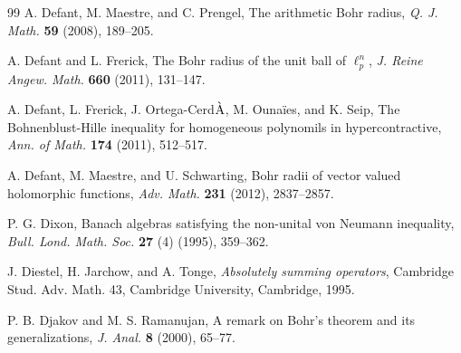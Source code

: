 \documentclass[a4paper,11pt, reqno]{amsart}
\theoremstyle{definition}
\begin{document}
\begin{thebibliography}{99}
	 {\sc A. Defant,  M. Maestre}, and {\sc  C. Prengel}, The arithmetic Bohr radius, {\it Q. J. Math.} {\bf 59} (2008), 189--205.
	
	
	
	 {\sc A. Defant} and {\sc L. Frerick}, The Bohr radius of the unit ball of $\ell^n _p$, {\it J. Reine Angew. Math.} {\bf 660} (2011), 131--147.
	
	 {\sc A. Defant, L. Frerick, J. Ortega-Cerd${\rm \grave{A}}$, M. Ouna{\"i}es}, and {\sc K. Seip}, The Bohnenblust-Hille inequality for homogeneous polynomils in hypercontractive, {\it Ann. of Math.} {\bf 174} (2011), 512--517.
	
	
	
	
	
	 {\sc A. Defant, M. Maestre}, and {\sc  U. Schwarting}, Bohr radii of vector valued holomorphic functions, {\it Adv. Math.} {\bf 231} (2012), 2837--2857.
	
			 {\sc P. G. Dixon}, Banach algebras satisfying the non-unital von Neumann inequality, \textit{Bull. Lond. Math. Soc.} \textbf{27} (4) (1995), 359--362.
	
	 {\sc J. Diestel, H. Jarchow}, and {\sc A. Tonge}, {\it Absolutely summing operators}, Cambridge Stud. Adv. Math. 43, Cambridge University, Cambridge, 1995.
	
	
	 {\sc P. B. Djakov} and {\sc M. S. Ramanujan}, A remark on Bohr's theorem and its generalizations, \textit{J. Anal.} \textbf{8} (2000), 65--77.
	

\end{thebibliography}
\end{document}
